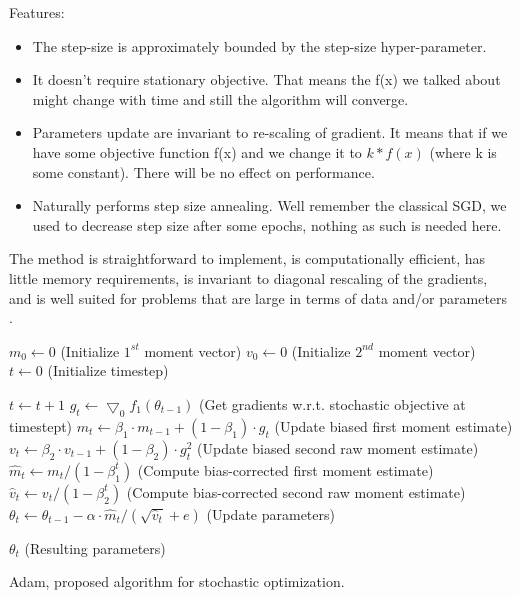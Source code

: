 Features:
\begin{itemize}
    \item The step-size is approximately bounded by the step-size hyper-parameter.
    \item It doesn't require stationary objective. That means the f(x) we talked about might change with time and still the algorithm will converge.
    \item Parameters update are invariant to re-scaling of gradient. It means that if we have some objective function f(x) and we change it to $k*f(x)$ (where k is some constant). There will be no effect on performance.
    \item Naturally performs step size annealing. Well remember the classical SGD, we used to decrease step size after some epochs, nothing as such is needed here.
\end{itemize}

The method is straightforward to implement, is computationally efficient, has little memory requirements, is invariant to diagonal rescaling of the gradients, and is well suited for problems that are large in terms of data and/or parameters \cite{Diederik}. 

\begin{algorithm}

    \Input{$\beta_1, \beta_2 \in [0, 1)$: Exponential decay rates for the moment estimates}
    
    $m_0 \leftarrow 0$ (Initialize $1^{st}$ moment vector)\;
    $v_0 \leftarrow 0$ (Initialize $2^{nd}$ moment vector)\;
    $t \leftarrow 0$ (Initialize timestep)\;
    
     {
        $t \leftarrow t + 1$ \;
        $g_t \leftarrow \bigtriangledown_0 f_1 (\theta_{t-1})$ (Get gradients w.r.t. stochastic objective at timestept)\;
        $m_t \leftarrow \beta_1 \cdot m_{t-1} + (1 - \beta_1) \cdot g_t$ (Update biased first moment estimate)\;
        $v_t \leftarrow \beta_2 \cdot v_{t-1} + (1-\beta_2) \cdot g_t^2$ (Update biased second raw moment estimate)\;
        $\widehat{m}_t \leftarrow m_t/(1 - \beta_1^t)$ (Compute bias-corrected first moment estimate)\;
        $\widehat{v}_t \leftarrow v_t/(1 - \beta_2^t)$ (Compute bias-corrected second raw moment estimate)\;
        $\theta_t \leftarrow \theta_{t-1} - \alpha \cdot \widehat{m}_t / (\sqrt{\widehat{v}_t} + e)$ (Update parameters)\;
    }
    
    \Return $\theta_t$ (Resulting parameters)

    \label{alg:adamOptimizer}
    \caption{Adam, proposed algorithm for stochastic optimization.}
\end{algorithm}

